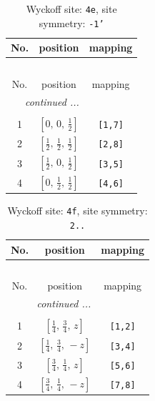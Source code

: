 \documentclass[fleqn,8pt]{jsarticle}
\begin{document}
\begin{longtable}{ccc}
\caption{Wyckoff site: {\tt 4e}, site symmetry: {\tt -1'}}
 \\
 \hline \hline
No. & position & mapping \\ \hline \endfirsthead

\multicolumn{2}{l}{\tablename\ \thetable{}} \\
 \hline \hline
No. & position & mapping \\ \hline \endhead

 \hline \hline
\multicolumn{2}{r}{\footnotesize\it continued ...} \\ \endfoot

 \hline \hline
\multicolumn{2}{r}{} \\ \endlastfoot

1 & $\left[ 0,\, 0,\, \frac{1}{2} \right]$ & {\tt [1,7]} \\ \hline
2 & $\left[ \frac{1}{2},\, \frac{1}{2},\, \frac{1}{2} \right]$ & {\tt [2,8]} \\ \hline
3 & $\left[ \frac{1}{2},\, 0,\, \frac{1}{2} \right]$ & {\tt [3,5]} \\ \hline
4 & $\left[ 0,\, \frac{1}{2},\, \frac{1}{2} \right]$ & {\tt [4,6]} \\
\end{longtable}
\renewcommand{\arraystretch}{1.2}
\begin{longtable}{ccc}
\caption{Wyckoff site: {\tt 4f}, site symmetry: {\tt 2..}}
 \\
 \hline \hline
No. & position & mapping \\ \hline \endfirsthead

\multicolumn{2}{l}{\tablename\ \thetable{}} \\
 \hline \hline
No. & position & mapping \\ \hline \endhead

 \hline \hline
\multicolumn{2}{r}{\footnotesize\it continued ...} \\ \endfoot

 \hline \hline
\multicolumn{2}{r}{} \\ \endlastfoot

1 & $\left[ \frac{1}{4},\, \frac{3}{4},\, z \right]$ & {\tt [1,2]} \\ \hline
2 & $\left[ \frac{1}{4},\, \frac{3}{4},\, - z \right]$ & {\tt [3,4]} \\ \hline
3 & $\left[ \frac{3}{4},\, \frac{1}{4},\, z \right]$ & {\tt [5,6]} \\ \hline
4 & $\left[ \frac{3}{4},\, \frac{1}{4},\, - z \right]$ & {\tt [7,8]} \\
\end{longtable}
\end{document}

